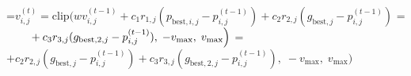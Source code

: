 \documentclass[final,5p,times,twocolumn]{elsarticle}
\begin{document}
=\hbox{$\displaystyle v_{i,j}^{(t)} = \mathrm{clip}\Big(w v_{i,j}^{(t-1)} + c_1 r_{1,j} (p_{\mathrm{best},i,j} - p_{i,j}^{(t-1)}) + c_2 r_{2,j} (g_{\mathrm{best},j} - p_{i,j}^{(t-1)}) $}
\showthe{}
=\hbox{$\displaystyle \null\qquad + c_3 r_{3,j} (g_{\mathrm{best},2,j} - p_{i,j}^{(t-1)}), \; -v_{\max}, \; v_{\max}\Big) $}
\showthe{}
=\hbox{$\displaystyle + c_2 r_{2,j} (g_{\mathrm{best},j} - p_{i,j}^{(t-1)}) + c_3 r_{3,j} (g_{\mathrm{best},2,j} - p_{i,j}^{(t-1)}), \; -v_{\max}, \; v_{\max}\Big) $}
\showthe{}
\end{document}
